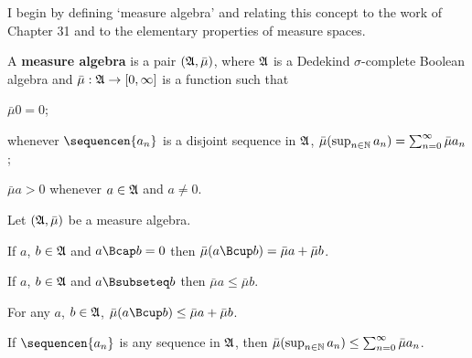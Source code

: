  
\def\chaptername{Measure algebras} 
\def\sectionname{Measure algebras} 
 
 
I begin by defining `measure algebra' and relating this concept to the 
work of Chapter 31 and to the elementary properties of measure 
spaces. 
 
 A {\bf measure algebra} is a pair  
$(\frak A,\bar\mu)$, where $\frak A$ is a Dedekind 
$\sigma$-complete Boolean algebra and $\bar\mu:\frak A\to[0,\infty]$ is 
a function such that 
 
\qquad $\bar\mu 0=0$; 
 
\qquad whenever $\sequencen{a_n}$ is a disjoint sequence in $\frak A$, 
$\bar\mu(\sup_{n\in\Bbb N}a_n)=\sum_{n=0}^{\infty}\bar\mu a_n$; 
 
\qquad $\bar\mu a>0$ whenever $a\in\frak A$ and $a\ne 0$. 
 
Let $(\frak A,\bar\mu)$ be a measure algebra. 
 
 If $a$, $b\in\frak A$ and $a\Bcap b=0$ then 
$\bar\mu(a\Bcup b)=\bar\mu a+\bar\mu b$.    
 
 If $a$, $b\in\frak A$ and $a\Bsubseteq b$ then 
$\bar\mu a\le\bar\mu b$.    
 
 For any $a$, $b\in\frak A$,  
$\bar\mu(a\Bcup b)\le\bar\mu a+\bar\mu b$.    
 
 If $\sequencen{a_n}$ is any sequence in  
$\frak A$, then  
$\bar\mu(\sup_{n\in\Bbb N}a_n)\le\sum_{n=0}^{\infty}\bar\mu a_n$. 
 
